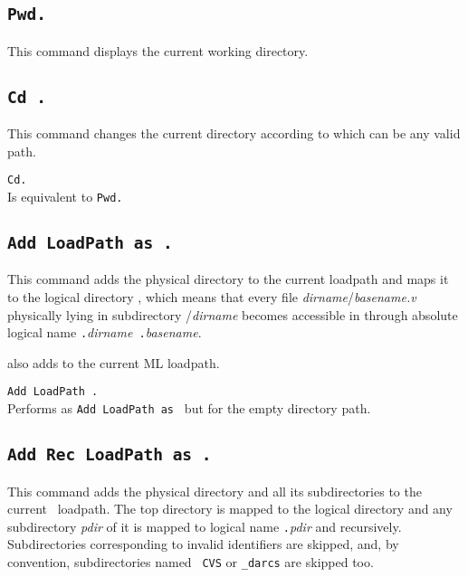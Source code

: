 \subsection[\tt Pwd.]{\tt Pwd.\label{Pwd}}
This command displays the current working directory.

\subsection[\tt Cd {\str}.]{\tt Cd {\str}.}
This command changes the current directory according to {\str} 
which can be any valid path.

\begin{Variants}
\item {\tt Cd.}\\
  Is equivalent to {\tt Pwd.}
\end{Variants}

\subsection[\tt Add LoadPath {\str} as {\dirpath}.]{\tt Add LoadPath {\str} as {\dirpath}.\label{AddLoadPath}}

This command adds the physical directory {\str} to the current {\Coq}
loadpath and maps it to the logical directory {\dirpath}, which means
that every file \textrm{\textsl{dirname}}/\textrm{\textsl{basename.v}}
physically lying in subdirectory {\str}/\textrm{\textsl{dirname}}
becomes accessible in {\Coq} through absolute logical name
{\dirpath}{\tt .}\textrm{\textsl{dirname}}{\tt
.}\textrm{\textsl{basename}}.

 also adds {\str} to the current ML loadpath.

\begin{Variants}
\item {\tt Add LoadPath {\str}.}\\
Performs as {\tt Add LoadPath {\str} as {\dirpath}} but for the empty directory path.
\end{Variants}

\subsection[\tt Add Rec LoadPath {\str} as {\dirpath}.]{\tt Add Rec LoadPath {\str} as {\dirpath}.\label{AddRecLoadPath}}
This command adds the physical directory {\str} and all its subdirectories to
the current \Coq\ loadpath. The top directory {\str} is mapped to the
logical directory {\dirpath} and any subdirectory {\textsl{pdir}} of it is
mapped to logical name {\dirpath}{\tt .}\textsl{pdir} and
recursively. Subdirectories corresponding to invalid {\Coq}
identifiers are skipped, and, by convention, subdirectories named {\tt
CVS} or {\tt \_darcs} are skipped too.

